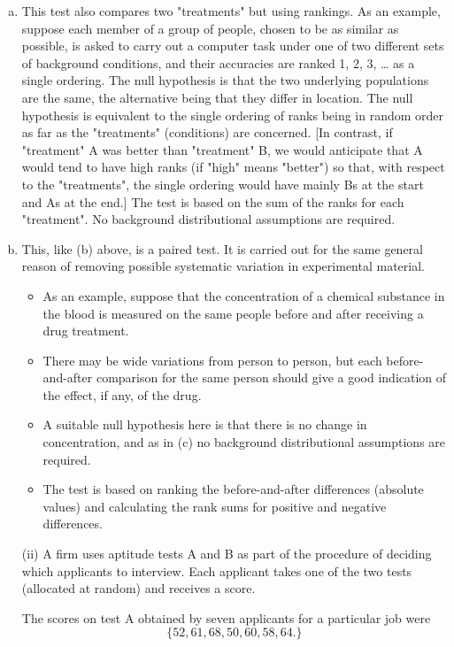 \documentclass[a4paper,12pt]{article}
\begin{document}
\begin{enumerate}[(a)]
 
\item  This test also compares two "treatments" but using rankings. 
 As an example, suppose each member of a group of people, chosen to be as similar as possible, is asked to carry out a computer task under one of two different sets of background conditions, and their accuracies are ranked 1, 2, 3, … as a single ordering.  The null hypothesis is that the two underlying populations are the same, the alternative being that they differ in location.  The null hypothesis is equivalent to the single ordering of ranks being in random order as far as the "treatments" (conditions) are concerned.  [In contrast, if "treatment" A was better than "treatment" B, we would anticipate that A would tend to have high ranks (if "high" means "better") so that, with respect to the "treatments", the single ordering would have mainly Bs at the start and As at the end.]  The test is based on the sum of the ranks for each "treatment".  No background distributional assumptions are required. 
 
\item  This, like (b) above, is a paired test.  It is carried out for the same general reason of removing possible systematic variation in experimental material. 
\begin{itemize}
    \item  As an example, suppose that the concentration of a chemical substance in the blood is measured on the same people before and after receiving a drug treatment.  
    \item There may be wide variations from person to person, but each before-and-after comparison for the same person should give a good indication of the effect, if any, of the drug. 
    \item A suitable null hypothesis here is that there is no change in concentration, and as in (c) no background distributional assumptions are required. 
    \item The test is based on ranking the before-and-after differences (absolute values) and calculating the rank sums for positive and negative differences. 
\end{itemize}

 
\newpage

\begin{framed}
(ii) A firm uses aptitude tests A and B as part of the procedure of deciding which applicants to interview.  Each applicant takes one of the two tests (allocated at random) and receives a score. 
 
The scores on test A obtained by seven applicants for a particular job were 
\[\{ 52,  61,  68,  50,  60,  58,  64. \}\]
 

\end{framed}
\end{enumerate}
\end{document}
